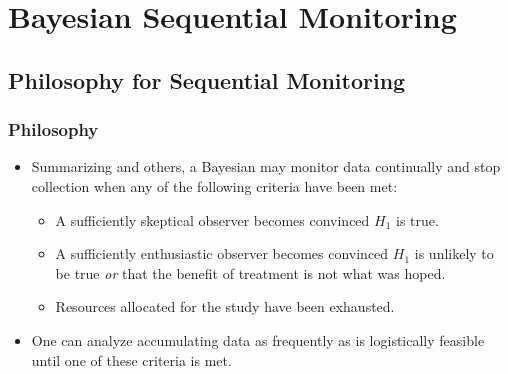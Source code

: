 \documentclass{beamer}
\begin{document}
\section{Bayesian Sequential Monitoring}

\subsection{Philosophy for Sequential Monitoring}
\begin{frame} \frametitle{Philosophy}

\begin{itemize}
	\item Summarizing \cite{Spiegelhalter1994} and others, a Bayesian may monitor data 
				continually and stop collection when any of the following criteria have been met:
		\begin{itemize}
		  \vspace{0.4cm}
			\item A sufficiently skeptical observer becomes convinced $H_1$ is true.
			
			\vspace{0.4cm}
			\item A sufficiently enthusiastic observer becomes convinced $H_1$ is unlikely to be true 
						\textit{or} that the benefit of treatment is not what was hoped.
			
			
			\vspace{0.4cm}
			\item Resources allocated for the study have been exhausted.
		\end{itemize}
		
		\vspace{0.25cm}		
	\item One can analyze accumulating data as frequently as is logistically
	      feasible until one of these criteria is met.
	\end{itemize}
\end{frame}
\end{document}
